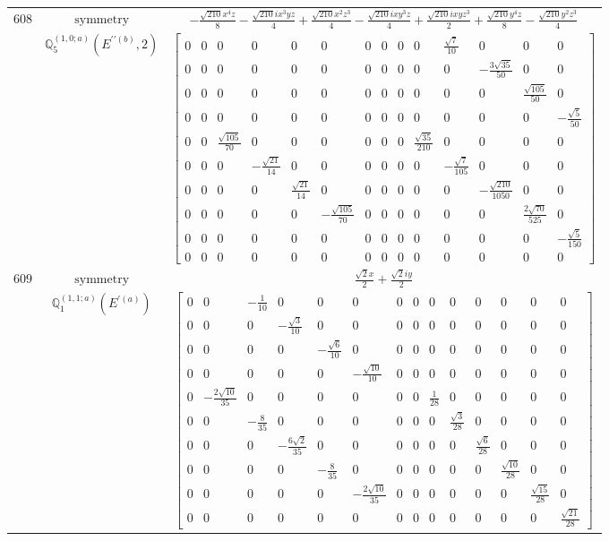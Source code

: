 \documentclass[fleqn,8pt,landscape]{jsarticle}
\begin{document}
\begin{longtable}{ccc}
$ 608 $ & $ \text{symmetry} $ & $ - \frac{\sqrt{210} x^{4} z}{8} - \frac{\sqrt{210} i x^{3} y z}{4} + \frac{\sqrt{210} x^{2} z^{3}}{4} - \frac{\sqrt{210} i x y^{3} z}{4} + \frac{\sqrt{210} i x y z^{3}}{2} + \frac{\sqrt{210} y^{4} z}{8} - \frac{\sqrt{210} y^{2} z^{3}}{4} $ \\
$  $ & $ \mathbb{Q}_{5}^{(1,0;a)}(E^{\prime\prime(b)},2) $ & $ \begin{bmatrix} 0 & 0 & 0 & 0 & 0 & 0 & 0 & 0 & 0 & 0 & \frac{\sqrt{7}}{10} & 0 & 0 & 0 \\ 0 & 0 & 0 & 0 & 0 & 0 & 0 & 0 & 0 & 0 & 0 & - \frac{3 \sqrt{35}}{50} & 0 & 0 \\ 0 & 0 & 0 & 0 & 0 & 0 & 0 & 0 & 0 & 0 & 0 & 0 & \frac{\sqrt{105}}{50} & 0 \\ 0 & 0 & 0 & 0 & 0 & 0 & 0 & 0 & 0 & 0 & 0 & 0 & 0 & - \frac{\sqrt{5}}{50} \\ 0 & 0 & \frac{\sqrt{105}}{70} & 0 & 0 & 0 & 0 & 0 & 0 & \frac{\sqrt{35}}{210} & 0 & 0 & 0 & 0 \\ 0 & 0 & 0 & - \frac{\sqrt{21}}{14} & 0 & 0 & 0 & 0 & 0 & 0 & - \frac{\sqrt{7}}{105} & 0 & 0 & 0 \\ 0 & 0 & 0 & 0 & \frac{\sqrt{21}}{14} & 0 & 0 & 0 & 0 & 0 & 0 & - \frac{\sqrt{210}}{1050} & 0 & 0 \\ 0 & 0 & 0 & 0 & 0 & - \frac{\sqrt{105}}{70} & 0 & 0 & 0 & 0 & 0 & 0 & \frac{2 \sqrt{70}}{525} & 0 \\ 0 & 0 & 0 & 0 & 0 & 0 & 0 & 0 & 0 & 0 & 0 & 0 & 0 & - \frac{\sqrt{5}}{150} \\ 0 & 0 & 0 & 0 & 0 & 0 & 0 & 0 & 0 & 0 & 0 & 0 & 0 & 0 \end{bmatrix} $ \\ \hline
$ 609 $ & $ \text{symmetry} $ & $ \frac{\sqrt{2} x}{2} + \frac{\sqrt{2} i y}{2} $ \\
$  $ & $ \mathbb{Q}_{1}^{(1,1;a)}(E^{\prime(a)}) $ & $ \begin{bmatrix} 0 & 0 & - \frac{1}{10} & 0 & 0 & 0 & 0 & 0 & 0 & 0 & 0 & 0 & 0 & 0 \\ 0 & 0 & 0 & - \frac{\sqrt{3}}{10} & 0 & 0 & 0 & 0 & 0 & 0 & 0 & 0 & 0 & 0 \\ 0 & 0 & 0 & 0 & - \frac{\sqrt{6}}{10} & 0 & 0 & 0 & 0 & 0 & 0 & 0 & 0 & 0 \\ 0 & 0 & 0 & 0 & 0 & - \frac{\sqrt{10}}{10} & 0 & 0 & 0 & 0 & 0 & 0 & 0 & 0 \\ 0 & - \frac{2 \sqrt{10}}{35} & 0 & 0 & 0 & 0 & 0 & 0 & \frac{1}{28} & 0 & 0 & 0 & 0 & 0 \\ 0 & 0 & - \frac{8}{35} & 0 & 0 & 0 & 0 & 0 & 0 & \frac{\sqrt{3}}{28} & 0 & 0 & 0 & 0 \\ 0 & 0 & 0 & - \frac{6 \sqrt{2}}{35} & 0 & 0 & 0 & 0 & 0 & 0 & \frac{\sqrt{6}}{28} & 0 & 0 & 0 \\ 0 & 0 & 0 & 0 & - \frac{8}{35} & 0 & 0 & 0 & 0 & 0 & 0 & \frac{\sqrt{10}}{28} & 0 & 0 \\ 0 & 0 & 0 & 0 & 0 & - \frac{2 \sqrt{10}}{35} & 0 & 0 & 0 & 0 & 0 & 0 & \frac{\sqrt{15}}{28} & 0 \\ 0 & 0 & 0 & 0 & 0 & 0 & 0 & 0 & 0 & 0 & 0 & 0 & 0 & \frac{\sqrt{21}}{28} \end{bmatrix} $ \\ \hline

\end{longtable}
\end{document}
